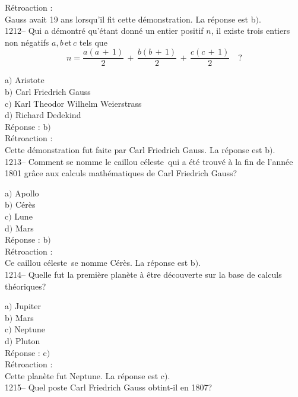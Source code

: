 ﻿\documentclass[letterpaper, 12pt]{article}
\begin{document}
R\'etroaction : \\
Gauss avait 19 ans lorsqu'il fit cette d\'emonstration.
La r\'eponse est b$)$.\\

1212-- Qui a d\'emontr\'e qu'\'etant donn\'e un entier positif $n$,
il existe trois entiers non n\'egatifs $a,b\,$et$\,c$ tels que
$$\displaystyle{n=\frac{a(a\,+\,1)}2\,+\,\frac{b(b\,+\,1)}2\,+\,\frac{c(c\,+\,1)}2}\quad?$$

a$)$ Aristote \\
b$)$ Carl Friedrich Gauss \\
c$)$ Karl Theodor Wilhelm Weierstrass \\
d$)$ Richard Dedekind\\

R\'eponse : b$)$\\

R\'etroaction : \\
Cette d\'emonstration fut faite par Carl Friedrich Gauss.
La r\'eponse est b$)$.\\

1213-- Comment se nomme le \og caillou c\'eleste\fg\ qui a \'et\'e
trouv\'e \`a la fin de l'ann\'ee 1801 gr\^ace aux calculs
math\'ematiques de Carl Friedrich Gauss?

a$)$ Apollo \\
b$)$ C\'er\`es \\
c$)$ Lune \\
d$)$ Mars\\

R\'eponse : b$)$\\

R\'etroaction : \\
Ce \og caillou c\'eleste\fg\ se nomme C\'er\`es.
La r\'eponse est b$)$.\\

1214-- Quelle fut la premi\`ere plan\`ete \`a \^etre d\'ecouverte
sur la base de calculs th\'eoriques?

a$)$ Jupiter \\
b$)$ Mars \\
c$)$ Neptune \\
d$)$ Pluton\\

R\'eponse : c$)$\\

R\'etroaction : \\
Cette plan\`ete fut Neptune.
La r\'eponse est c$)$.\\

1215-- Quel poste Carl Friedrich Gauss obtint-il en 1807?
\end{document}
